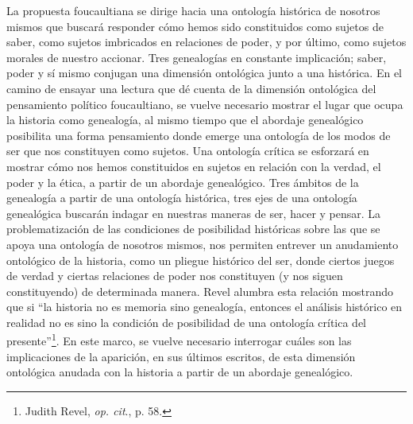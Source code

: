 La propuesta foucaultiana se dirige hacia una ontología histórica de nosotros mismos que buscará responder cómo hemos sido constituidos como sujetos de saber, como sujetos imbricados en relaciones de poder, y por último, como sujetos morales de nuestro accionar. Tres genealogías en constante implicación; saber, poder y sí mismo conjugan una dimensión ontológica junto a una histórica. En el camino de ensayar una lectura que dé cuenta de la dimensión ontológica del pensamiento político foucaultiano, se vuelve necesario mostrar el lugar que ocupa la historia como genealogía, al mismo tiempo que el abordaje genealógico posibilita una forma pensamiento donde emerge una ontología de los modos de ser que nos constituyen como sujetos. Una ontología crítica se esforzará en mostrar cómo nos hemos constituidos en sujetos en relación con la verdad, el poder y la ética, a partir de un abordaje genealógico. Tres ámbitos de la genealogía a partir de una ontología histórica, tres ejes de una ontología genealógica buscarán indagar en nuestras maneras de ser, hacer y pensar. La problematización de las condiciones de posibilidad históricas sobre las que se apoya una ontología de nosotros mismos, nos permiten entrever un anudamiento ontológico de la historia, como un pliegue histórico del ser, donde ciertos juegos de verdad y ciertas relaciones de poder nos constituyen (y nos siguen constituyendo) de determinada manera. Revel alumbra esta relación mostrando que si \enquote{la historia no es memoria sino genealogía, entonces el análisis histórico en realidad no es sino la condición de posibilidad de una ontología crítica del presente}\footnote{Judith Revel, \emph{op. cit}., p. 58.}. En este marco, se vuelve necesario interrogar cuáles son las implicaciones de la aparición, en sus últimos escritos, de esta dimensión ontológica anudada con la historia a partir de un abordaje genealógico.

